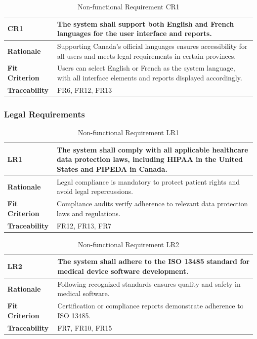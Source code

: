\documentclass[12pt]{article}
\begin{document}
\begin{table}[h!]
\centering
{}
\begin{tabular}{|p{3.5cm}|p{11.5cm}|}
\hline
\rowcolor{gray!30}
\textbf{CR1} & The system shall support both English and French languages for the user interface and reports. \\
\hline
\textbf{Rationale} & Supporting Canada's official languages ensures accessibility for all users and meets legal requirements in certain provinces. \\
\hline
\textbf{Fit Criterion} & Users can select English or French as the system language, with all interface elements and reports displayed accordingly. \\
\hline
\textbf{Traceability} & FR6, FR12, FR13 \\
\hline
\end{tabular}
\caption{Non-functional Requirement CR1}
\end{table}
\subsubsection{Legal Requirements}

\begin{table}[h!]
\centering
{}
\begin{tabular}{|p{3.5cm}|p{11.5cm}|}
\hline
\rowcolor{gray!30}
\textbf{LR1} & The system shall comply with all applicable healthcare data protection laws, including HIPAA in the United States and PIPEDA in Canada. \\
\hline
\textbf{Rationale} & Legal compliance is mandatory to protect patient rights and avoid legal repercussions. \\
\hline
\textbf{Fit Criterion} & Compliance audits verify adherence to relevant data protection laws and regulations. \\
\hline
\textbf{Traceability} & FR12, FR13, FR7 \\
\hline
\end{tabular}
\caption{Non-functional Requirement LR1}
\end{table}

\begin{table}[h!]
\centering
{}
\begin{tabular}{|p{3.5cm}|p{11.5cm}|}
\hline
\rowcolor{gray!30}
\textbf{LR2} & The system shall adhere to the ISO 13485 standard for medical device software development. \\
\hline
\textbf{Rationale} & Following recognized standards ensures quality and safety in medical software. \\
\hline
\textbf{Fit Criterion} & Certification or compliance reports demonstrate adherence to ISO 13485. \\
\hline
\textbf{Traceability} & FR7, FR10, FR15 \\
\hline
\end{tabular}
\caption{Non-functional Requirement LR2}
\end{table}
\newpage
\end{document}
